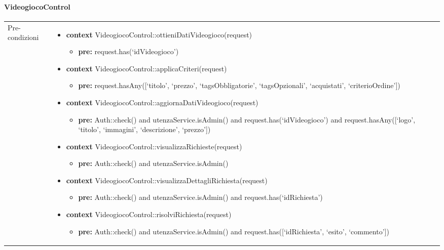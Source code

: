 \paragraph{VideogiocoControl}
\small\begin{tabular}{|| l | p{28.5em} ||} 
\hline
Pre-condizioni & \begin{itemize}[leftmargin=*]
	\item \textbf{context} VideogiocoControl::ottieniDatiVideogioco(request)
	\begin{itemize}
		\item[ ] \textbf{pre:} request.has(‘idVideogioco’)
	\end{itemize}
  
	\item \textbf{context} VideogiocoControl::applicaCriteri(request)
	\begin{itemize}
		\item[ ] \textbf{pre:} request.hasAny([‘titolo’, ‘prezzo’, ‘tagsObbligatorie’, ‘tagsOpzionali’, ‘acquistati’, ‘criterioOrdine’])
	\end{itemize} 
  
	\item \textbf{context} VideogiocoControl::aggiornaDatiVideogioco(request)
	\begin{itemize}
		\item[ ] \textbf{pre:} Auth::check() and utenzaService.isAdmin() and request.has(‘idVideogioco’) and request.hasAny([‘logo’, ‘titolo’, ‘immagini’, ‘descrizione’, ‘prezzo’]) 
	\end{itemize} 
  
	\item \textbf{context} VideogiocoControl::visualizzaRichieste(request)
	\begin{itemize}
		\item[ ] \textbf{pre:} Auth::check() and utenzaService.isAdmin()
	\end{itemize} 
  
	\item \textbf{context} VideogiocoControl::visualizzaDettagliRichiesta(request)
	\begin{itemize}
		\item[ ] \textbf{pre:} Auth::check() and utenzaService.isAdmin() and request.has(‘idRichiesta’)
	\end{itemize} 
  
	\item \textbf{context} VideogiocoControl::risolviRichiesta(request)
	\begin{itemize}
		\item[ ] \textbf{pre:} Auth::check() and utenzaService.isAdmin() and request.has([‘idRichiesta’, ‘esito’, ‘commento’])
	\end{itemize} 
  

\end{itemize}
\end{tabular}
